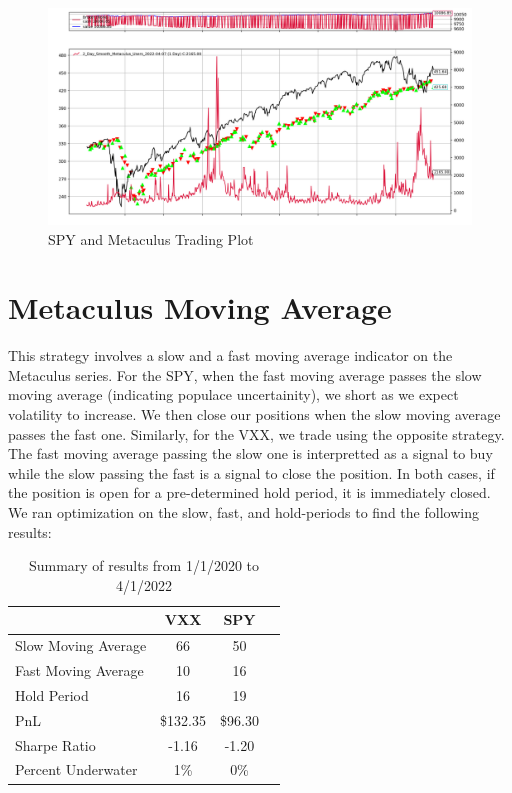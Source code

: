 \documentclass{article}
\begin{document}
\begin{figure}[H]
    \centering
    \includegraphics[width=\textwidth]{Metaculus_Momentum_SPY.png}
    \caption{SPY and Metaculus Trading Plot}
\end{figure}

\newpage

\section*{Metaculus Moving Average}
This strategy involves a slow and a fast moving average indicator on the Metaculus series. For the SPY, when the fast moving average passes the slow moving average (indicating populace uncertainity), we short as we expect volatility to increase. We then close our positions when the slow moving average passes the fast one.
Similarly, for the VXX, we trade using the opposite strategy. The fast moving average passing the slow one is interpretted as a signal to buy while the slow passing the fast is a signal to close the position. In both cases, if the position is open for a pre-determined hold period, it is immediately closed. We ran optimization on the slow, fast, and hold-periods to find the following results:

\begin{table}[h]
    \centering
    
    \begin{tabular}{l||ccc}
        \toprule
         & \textbf{VXX} & \textbf{SPY} & \\
        \midrule
        Slow Moving Average & 66  & 50\\
        Fast Moving Average & 10  & 16\\
        Hold Period & 16  & 19\\
        PnL & \$132.35 & \$96.30 \\
        Sharpe Ratio & -1.16 & -1.20\\
        Percent Underwater & 1\% &  0\%\\
        \bottomrule
    \end{tabular}
    \caption{Summary of results from 1/1/2020 to 4/1/2022}
    \end{table}
\end{document}
